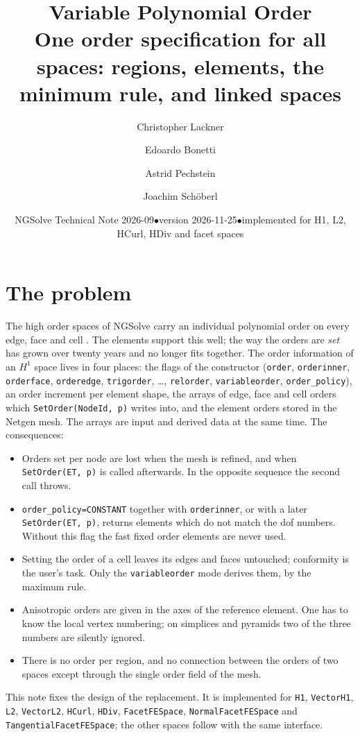 \documentclass[10pt,a4paper]{article}
\title{\vspace{-1.2cm}Variable Polynomial Order\\[2pt]
\large One order specification for all spaces: regions, elements, the minimum rule, and linked spaces}
\author{Christopher Lackner \and Edoardo Bonetti \and Astrid Pechstein \and Joachim Sch\"oberl}
\date{NGSolve Technical Note 2026-09\quad$\bullet$\quad version 2026-11-25\quad$\bullet$\quad implemented for H1, L2, HCurl, HDiv and facet spaces}
\newcommand{\code}[1]{\texttt{#1}}
\begin{document}
\maketitle\vspace{-1.2cm}

\section{The problem}

The high order spaces of NGSolve \cite{s14} carry an individual polynomial order on every edge, face and cell \cite{sz05,z06}. The elements support this well; the way the orders are \emph{set} has grown over twenty years and no longer fits together. The order information of an $H^1$ space lives in four places: the flags of the constructor (\code{order}, \code{orderinner}, \code{orderface}, \code{orderedge}, \code{trigorder}, \dots, \code{relorder}, \code{variableorder}, \code{order\_policy}), an order increment per element shape, the arrays of edge, face and cell orders which \code{SetOrder(NodeId, p)} writes into, and the element orders stored in the Netgen mesh. The arrays are input and derived data at the same time. The consequences:
\begin{itemize}\setlength\itemsep{1pt}
\item Orders set per node are lost when the mesh is refined, and when \code{SetOrder(ET, p)} is called afterwards. In the opposite sequence the second call throws.
\item \code{order\_policy=CONSTANT} together with \code{orderinner}, or with a later \code{SetOrder(ET, p)}, returns elements which do not match the dof numbers. Without this flag the fast fixed order elements are never used.
\item Setting the order of a cell leaves its edges and faces untouched; conformity is the user's task. Only the \code{variableorder} mode derives them, by the maximum rule.
\item Anisotropic orders are given in the axes of the reference element. One has to know the local vertex numbering; on simplices and pyramids two of the three numbers are silently ignored.
\item There is no order per region, and no connection between the orders of two spaces except through the single order field of the mesh.
\end{itemize}
This note fixes the design of the replacement. It is implemented for \code{H1}, \code{VectorH1}, \code{L2}, \code{VectorL2}, \code{HCurl}, \code{HDiv}, \code{FacetFESpace}, \code{NormalFacetFESpace} and \code{TangentialFacetFESpace}; the other spaces follow with the same interface.
\end{document}
